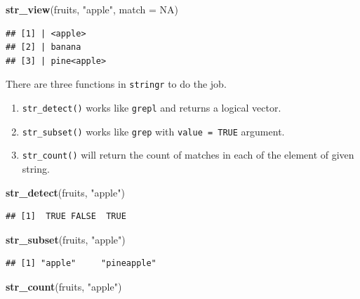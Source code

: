 \documentclass[
]{book}
\newenvironment{Shaded}{\begin{snugshade}}{\end{snugshade}}
\newcommand{\AttributeTok}[1]{\textcolor[rgb]{0.13,0.29,0.53}{#1}}
\newcommand{\ConstantTok}[1]{\textcolor[rgb]{0.56,0.35,0.01}{#1}}
\newcommand{\FunctionTok}[1]{\textcolor[rgb]{0.13,0.29,0.53}{\textbf{#1}}}
\newcommand{\NormalTok}[1]{#1}
\newcommand{\StringTok}[1]{\textcolor[rgb]{0.31,0.60,0.02}{#1}}
\providecommand{\tightlist}{%
  \setlength{\itemsep}{0pt}\setlength{\parskip}{0pt}}
\begin{document}
\begin{Shaded}
\begin{Highlighting}[]
\FunctionTok{str\_view}\NormalTok{(fruits, }\StringTok{"apple"}\NormalTok{, }\AttributeTok{match =} \ConstantTok{NA}\NormalTok{)}
\end{Highlighting}
\end{Shaded}

\begin{verbatim}
## [1] | <apple>
## [2] | banana
## [3] | pine<apple>
\end{verbatim}

There are three functions in \texttt{stringr} to do the job.

\begin{enumerate}
\def\labelenumi{\arabic{enumi}.}
\tightlist
\item
  \texttt{str\_detect()} works like \texttt{grepl} and returns a logical vector.
\item
  \texttt{str\_subset()} works like \texttt{grep} with \texttt{value\ =\ TRUE} argument.
\item
  \texttt{str\_count()} will return the count of matches in each of the element of given string.
\end{enumerate}

\begin{Shaded}
\begin{Highlighting}[]
\FunctionTok{str\_detect}\NormalTok{(fruits, }\StringTok{"apple"}\NormalTok{)}
\end{Highlighting}
\end{Shaded}

\begin{verbatim}
## [1]  TRUE FALSE  TRUE
\end{verbatim}

\begin{Shaded}
\begin{Highlighting}[]
\FunctionTok{str\_subset}\NormalTok{(fruits, }\StringTok{"apple"}\NormalTok{)}
\end{Highlighting}
\end{Shaded}

\begin{verbatim}
## [1] "apple"     "pineapple"
\end{verbatim}

\begin{Shaded}
\begin{Highlighting}[]
\FunctionTok{str\_count}\NormalTok{(fruits, }\StringTok{"apple"}\NormalTok{)}
\end{Highlighting}
\end{Shaded}
\end{document}
